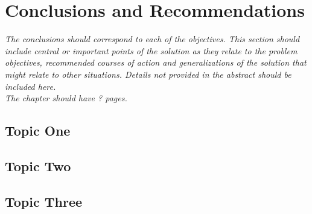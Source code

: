 \chapter{Conclusions and Recommendations}
\label{cha:Conclusions}      %

\emph{The conclusions should correspond to each of the objectives. 
This section should include central or important points of the solution as they relate to the problem objectives, recommended courses of action and generalizations of the solution that might relate to other situations. 
Details not provided in the abstract should be included here.\\
The chapter should have ? pages.
}
\section{Topic One}
\lipsum
\section{Topic Two}
\lipsum
\section{Topic Three}
\lipsum